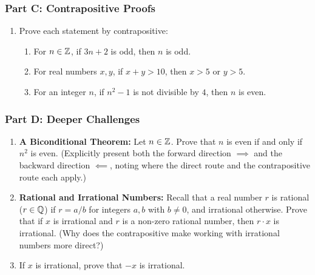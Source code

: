\subsubsection*{Part C: Contrapositive Proofs}
\begin{enumerate}[resume]
\item Prove each statement by contrapositive:
\begin{enumerate}
\item For $n \in \mathbb{Z}$, if $3n + 2$ is odd, then $n$ is odd.
\item For real numbers $x, y$, if $x + y > 10$, then $x > 5$ or $y > 5$.
\item For an integer $n$, if $n^2 - 1$ is not divisible by $4$, then $n$ is even.
\end{enumerate}
\end{enumerate}

\subsubsection*{Part D: Deeper Challenges}
\begin{enumerate}[resume]
\item \textbf{A Biconditional Theorem:} Let $n \in \mathbb{Z}$. Prove that $n$ is even if and only if $n^2$ is even. (Explicitly present both the forward direction $\implies$ and the backward direction $\impliedby$, noting where the direct route and the contrapositive route each apply.)
\item \textbf{Rational and Irrational Numbers:} Recall that a real number $r$ is rational ($r \in \mathbb{Q}$) if $r = a/b$ for integers $a, b$ with $b \neq 0$, and irrational otherwise. Prove that if $x$ is irrational and $r$ is a non-zero rational number, then $r \cdot x$ is irrational. (Why does the contrapositive make working with irrational numbers more direct?)
\item If $x$ is irrational, prove that $-x$ is irrational.
\end{enumerate}

\newpage
